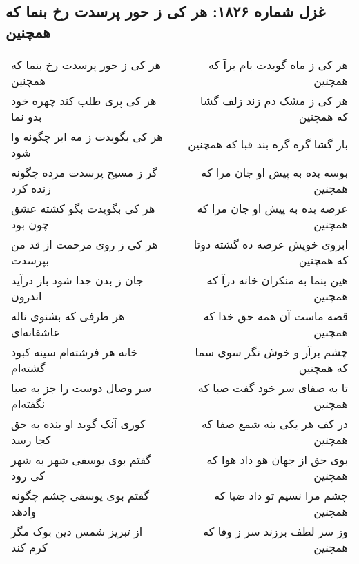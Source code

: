 \begin{center}
\section*{غزل شماره ۱۸۲۶: هر کی ز حور پرسدت رخ بنما که همچنین}
\label{sec:1826}
\begin{longtable}{l p{0.5cm} r}
هر کی ز حور پرسدت رخ بنما که همچنین
&&
هر کی ز ماه گویدت بام برآ که همچنین
\\
هر کی پری طلب کند چهره خود بدو نما
&&
هر کی ز مشک دم زند زلف گشا که همچنین
\\
هر کی بگویدت ز مه ابر چگونه وا شود
&&
باز گشا گره گره بند قبا که همچنین
\\
گر ز مسیح پرسدت مرده چگونه زنده کرد
&&
بوسه بده به پیش او جان مرا که همچنین
\\
هر کی بگویدت بگو کشته عشق چون بود
&&
عرضه بده به پیش او جان مرا که همچنین
\\
هر کی ز روی مرحمت از قد من بپرسدت
&&
ابروی خویش عرضه ده گشته دوتا که همچنین
\\
جان ز بدن جدا شود باز درآید اندرون
&&
هین بنما به منکران خانه درآ که همچنین
\\
هر طرفی که بشنوی ناله عاشقانه‌ای
&&
قصه ماست آن همه حق خدا که همچنین
\\
خانه هر فرشته‌ام سینه کبود گشته‌ام
&&
چشم برآر و خوش نگر سوی سما که همچنین
\\
سر وصال دوست را جز به صبا نگفته‌ام
&&
تا به صفای سر خود گفت صبا که همچنین
\\
کوری آنک گوید او بنده به حق کجا رسد
&&
در کف هر یکی بنه شمع صفا که همچنین
\\
گفتم بوی یوسفی شهر به شهر کی رود
&&
بوی حق از جهان هو داد هوا که همچنین
\\
گفتم بوی یوسفی چشم چگونه وادهد
&&
چشم مرا نسیم تو داد ضیا که همچنین
\\
از تبریز شمس دین بوک مگر کرم کند
&&
وز سر لطف برزند سر ز وفا که همچنین
\\
\end{longtable}
\end{center}
